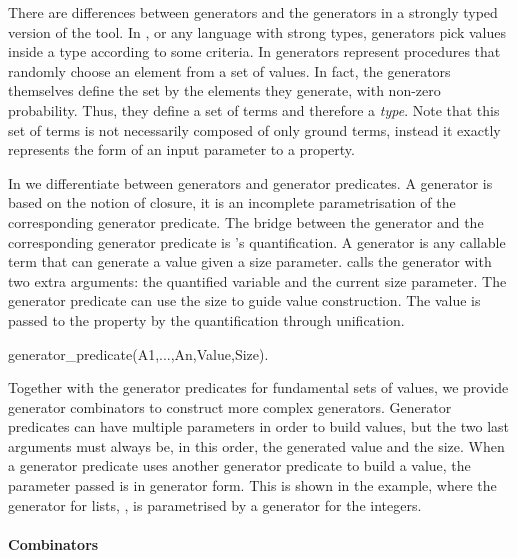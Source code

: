 There are  differences between \plqc{} generators and the
generators in a strongly typed version of the tool.
%
In \Haskell{} \QuickCheck{}, or any language with strong types,
generators pick values inside a type according to some criteria.
%
In \plqc{} generators represent procedures that randomly choose an element
from a set of values.
%
In fact, the generators themselves define the set by the elements
they generate, with non-zero probability.
%
Thus, they define a set of terms and therefore a \emph{type}.
%
Note that this set of terms is not necessarily composed of only ground
terms, instead it
 exactly represents
the form of an input parameter to a
property.


In \plqc{} we differentiate between generators and generator
predicates.
%
A generator is based on the notion of closure, it is an incomplete
parametrisation of the corresponding generator predicate.
%
The bridge between the generator and the corresponding generator
predicate is %
\plqc{}'s quantification.
%
A generator is any callable term that can generate a value given a
size parameter.
%
\plqc{} 
calls the generator with two extra
arguments: the quantified variable and the current size parameter.
%
The generator predicate can use the size to guide value
construction.
%
The value is passed to the property by the \plqc{} quantification
through unification.


\begin{yapcode}
 generator_predicate(A1,...,An,Value,Size).
\end{yapcode}
%
Together with the generator predicates for fundamental sets of values, we %
provide
 generator combinators to construct more complex
generators.
%
Generator predicates can have multiple parameters in order to build
values, but the two last arguments must always be, in this order, the
generated value and the size.
%
When a generator predicate uses another generator predicate to build a
value, the parameter passed is in generator form.
%
This is shown in the example,
where the generator for lists, , is parametrised by a
generator for the integers.


\paragraph{\bf Combinators}

